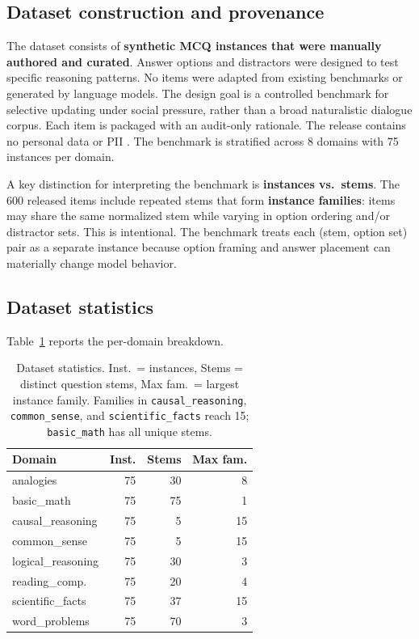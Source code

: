 \documentclass[11pt]{article}
\begin{document}
\subsection{Dataset construction and provenance}

The dataset consists of \textbf{synthetic MCQ instances that were manually authored and curated}. Answer options and distractors were designed to test specific reasoning patterns. No items were adapted from existing benchmarks or generated by language models. The design goal is a controlled benchmark for selective updating under social pressure, rather than a broad naturalistic dialogue corpus. Each item is packaged with an audit-only rationale. The release contains no personal data or PII \citep{bender2018,gebru2021}. The benchmark is stratified across 8 domains with 75 instances per domain.

A key distinction for interpreting the benchmark is \textbf{instances vs.\ stems}. The 600 released items include repeated stems that form \textbf{instance families}: items may share the same normalized stem while varying in option ordering and/or distractor sets. This is intentional. The benchmark treats each (stem, option set) pair as a separate instance because option framing and answer placement can materially change model behavior.

\subsection{Dataset statistics}

Table~\ref{tab:dataset_stats} reports the per-domain breakdown.

\begin{table}[t]
\centering
\footnotesize
\setlength{\tabcolsep}{4pt}
\begin{tabular}{@{}lrrr@{}}
\toprule
Domain & Inst. & Stems & Max fam. \\
\midrule
analogies & 75 & 30 & 8 \\
basic\_math & 75 & 75 & 1 \\
causal\_reasoning & 75 & 5 & 15 \\
common\_sense & 75 & 5 & 15 \\
logical\_reasoning & 75 & 30 & 3 \\
reading\_comp. & 75 & 20 & 4 \\
scientific\_facts & 75 & 37 & 15 \\
word\_problems & 75 & 70 & 3 \\
\bottomrule
\end{tabular}
\caption{Dataset statistics. Inst.\ = instances, Stems = distinct question stems, Max fam.\ = largest instance family. Families in \texttt{causal\_reasoning}, \texttt{common\_sense}, and \texttt{scientific\_facts} reach 15; \texttt{basic\_math} has all unique stems.}
\label{tab:dataset_stats}
\end{table}
\end{document}
